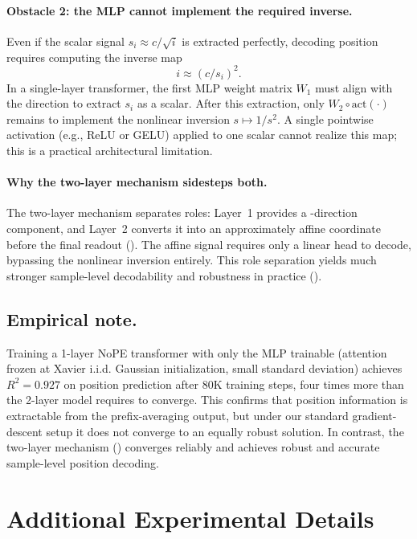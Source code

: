 \documentclass{article}
\theoremstyle{plain}
\theoremstyle{definition}
\theoremstyle{remark}
\begin{document}
\paragraph{Obstacle 2: the MLP cannot implement the required inverse.}
Even if the scalar signal $s_i \approx c/\sqrt{i}$ is extracted perfectly, decoding position requires computing the inverse map
\[
i \approx (c/s_i)^2.
\]
In a single-layer transformer, the first MLP weight matrix $W_1$ must align with the \bos direction to extract $s_i$ as a scalar.
After this extraction, only $W_2 \circ \mathrm{act}(\cdot)$ remains to implement the nonlinear inversion $s \mapsto 1/s^2$.
A single pointwise activation (e.g., ReLU or GELU) applied to one scalar cannot realize this map; this is a practical architectural limitation.

\paragraph{Why the two-layer mechanism sidesteps both.}
The two-layer mechanism separates roles: Layer~1 provides a \bos-direction component, and Layer~2 converts it into an approximately affine coordinate before the final readout
().
The affine signal requires only a linear head to decode, bypassing the nonlinear inversion entirely.
This role separation yields much stronger sample-level decodability and robustness in practice
().

\subsection{Empirical note.}
\label{app:1_block_empirical}
Training a 1-layer NoPE transformer with only the MLP trainable (attention frozen at Xavier i.i.d. Gaussian initialization, small standard deviation) achieves $R^2 = 0.927$ on position prediction after 80K training steps, four times more than the 2-layer model requires to converge. This confirms that position information is extractable from the prefix-averaging output, but under our standard gradient-descent setup it does not converge to an equally robust solution. In contrast, the two-layer mechanism () converges reliably and achieves robust and accurate sample-level position decoding.


\section{Additional Experimental Details}
\label{app:details}
\end{document}
